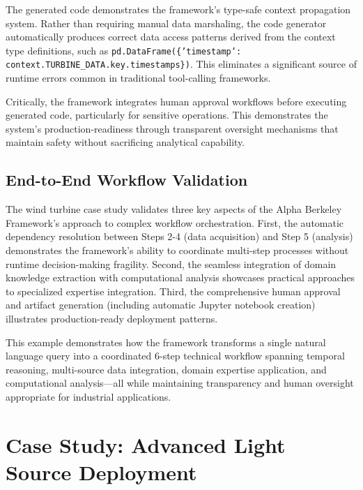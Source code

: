 The generated code demonstrates the framework's type-safe context propagation system. Rather than requiring manual data marshaling, the code generator automatically produces correct data access patterns derived from the context type definitions, such as \texttt{pd.DataFrame(\{'timestamp': context.TURBINE\_DATA.key.timestamps\})}. This eliminates a significant source of runtime errors common in traditional tool-calling frameworks.

Critically, the framework integrates human approval workflows before executing generated code, particularly for sensitive operations. This demonstrates the system's production-readiness through transparent oversight mechanisms that maintain safety without sacrificing analytical capability.

\subsection{End-to-End Workflow Validation}

The wind turbine case study validates three key aspects of the Alpha Berkeley Framework's approach to complex workflow orchestration. First, the automatic dependency resolution between Steps 2-4 (data acquisition) and Step 5 (analysis) demonstrates the framework's ability to coordinate multi-step processes without runtime decision-making fragility. Second, the seamless integration of domain knowledge extraction with computational analysis showcases practical approaches to specialized expertise integration. Third, the comprehensive human approval and artifact generation (including automatic Jupyter notebook creation) illustrates production-ready deployment patterns.

This example demonstrates how the framework transforms a single natural language query into a coordinated 6-step technical workflow spanning temporal reasoning, multi-source data integration, domain expertise application, and computational analysis—all while maintaining transparency and human oversight appropriate for industrial applications.


\section{Case Study: Advanced Light Source Deployment}
\label{sec:als}

